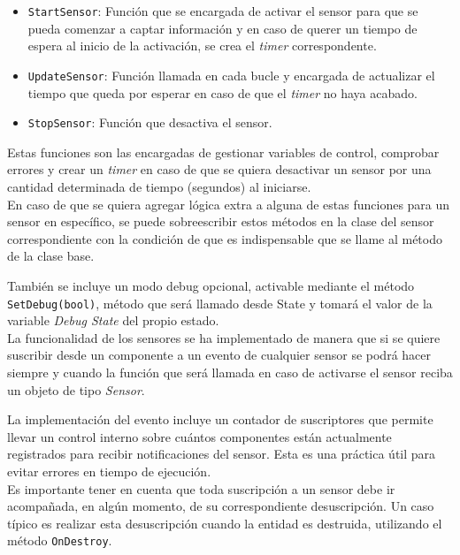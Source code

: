 \begin{itemize}
	\item \texttt{StartSensor}: Función que se encargada de activar el sensor para que se pueda comenzar a captar información y en caso de querer un tiempo de espera al inicio de la activación, se crea el \textit{timer} correspondente.
	\item \texttt{UpdateSensor}: Función llamada en cada bucle y encargada de actualizar el tiempo que queda por esperar en caso de que el \textit{timer} no haya acabado.
	\item \texttt{StopSensor}: Función que desactiva el sensor.
\end{itemize}
Estas funciones son las encargadas de gestionar variables de control, comprobar errores y crear un \textit{timer} en caso de que se quiera desactivar un sensor por una cantidad determinada de tiempo (segundos) al iniciarse.\\

En caso de que se quiera agregar lógica extra a alguna de estas funciones para un sensor en específico, se puede sobreescribir estos métodos en la clase del sensor correspondiente con la condición de que es indispensable que se llame al método de la clase base.

También se incluye un modo debug opcional, activable mediante el método \texttt{SetDebug(bool)}, método que será llamado desde State y tomará el valor de la variable \textit{Debug State} del propio estado.\\

La funcionalidad de los sensores se ha implementado de manera que si se quiere suscribir desde un componente a un evento de cualquier sensor se podrá hacer siempre y cuando la función que será llamada en caso de activarse el sensor reciba un objeto de tipo \textit{Sensor}.\\


La implementación del evento incluye un contador de suscriptores que permite llevar un control interno sobre cuántos componentes están actualmente registrados para recibir notificaciones del sensor. Esta es una práctica útil para evitar errores en tiempo de ejecución.\\

Es importante tener en cuenta que toda suscripción a un sensor debe ir acompañada, en algún momento, de su correspondiente desuscripción. Un caso típico es realizar esta desuscripción cuando la entidad es destruida, utilizando el método \texttt{OnDestroy}.\\

